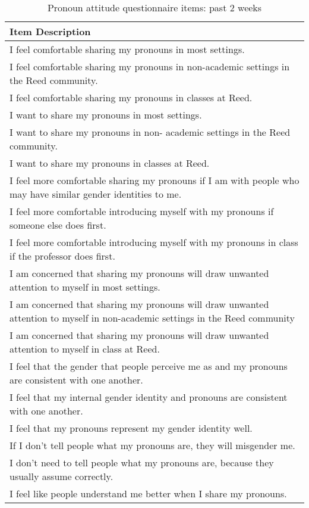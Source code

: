 \documentclass[12pt,twoside]{reedthesis}
\begin{document}
\begin{longtable}[t]{>{\raggedright\arraybackslash}p{35em}}
\caption{\label{tab:unnamed-chunk-1}Pronoun attitude questionnaire items: past 2 weeks}\\
\toprule
Item Description\\
\midrule
I feel comfortable sharing my pronouns in most settings.\\
I feel comfortable sharing my pronouns in non-academic settings in the Reed community.\\
I feel comfortable sharing my pronouns in classes at Reed.\\
I want to share my pronouns in most settings.\\
I want to share my pronouns in non- academic settings in the Reed community.\\
\addlinespace
I want to share my pronouns in classes at Reed.\\
I feel more comfortable sharing my pronouns if I am with people who may have similar gender identities to me.\\
I feel more comfortable introducing myself with my pronouns if someone else does first.\\
I feel more comfortable introducing myself with my pronouns in class if the professor does first.\\
I am concerned that sharing my pronouns will draw unwanted attention to myself in most settings.\\
\addlinespace
I am concerned that sharing my pronouns will draw unwanted attention to myself in non-academic settings in the Reed community\\
I am concerned that sharing my pronouns will draw unwanted attention to myself in class at Reed.\\
I feel that the gender that people perceive me as and my pronouns are consistent with one another.\\
I feel that my internal gender identity and pronouns are consistent with one another.\\
I feel that my pronouns represent my gender identity well.\\
\addlinespace
If I don’t tell people what my pronouns are, they will misgender me.\\
I don’t need to tell people what my pronouns are, because they usually assume correctly.\\
I feel like people understand me better when I share my pronouns.\\
\bottomrule
\end{longtable}
\end{document}
